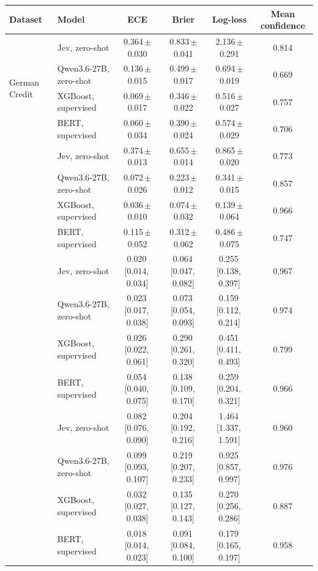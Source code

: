 \begin{tabular}{llcccc}
\toprule
Dataset & Model & ECE & Brier & Log-loss & Mean confidence \\
\midrule
\multirow{4}{*}{German Credit} & Jev, zero-shot & 0.364\,{\scriptsize$\pm$0.030} & 0.833\,{\scriptsize$\pm$0.041} & 2.136\,{\scriptsize$\pm$0.291} & 0.814 \\
 & Qwen3.6-27B, zero-shot & 0.136\,{\scriptsize$\pm$0.015} & 0.499\,{\scriptsize$\pm$0.017} & 0.694\,{\scriptsize$\pm$0.019} & 0.669 \\
 & XGBoost, supervised & 0.069\,{\scriptsize$\pm$0.017} & 0.346\,{\scriptsize$\pm$0.022} & 0.516\,{\scriptsize$\pm$0.027} & 0.757 \\
 & BERT, supervised & 0.060\,{\scriptsize$\pm$0.034} & 0.390\,{\scriptsize$\pm$0.024} & 0.574\,{\scriptsize$\pm$0.029} & 0.706 \\
\addlinespace
\multirow{4}{*}{Breast Cancer Wisconsin} & Jev, zero-shot & 0.374\,{\scriptsize$\pm$0.013} & 0.655\,{\scriptsize$\pm$0.014} & 0.865\,{\scriptsize$\pm$0.020} & 0.773 \\
 & Qwen3.6-27B, zero-shot & 0.072\,{\scriptsize$\pm$0.026} & 0.223\,{\scriptsize$\pm$0.012} & 0.341\,{\scriptsize$\pm$0.015} & 0.857 \\
 & XGBoost, supervised & 0.036\,{\scriptsize$\pm$0.010} & 0.074\,{\scriptsize$\pm$0.032} & 0.139\,{\scriptsize$\pm$0.064} & 0.966 \\
 & BERT, supervised & 0.115\,{\scriptsize$\pm$0.052} & 0.312\,{\scriptsize$\pm$0.062} & 0.486\,{\scriptsize$\pm$0.075} & 0.747 \\
\addlinespace
\multirow{4}{*}{SST-2} & Jev, zero-shot & 0.020\,{\scriptsize[0.014,\,0.034]} & 0.064\,{\scriptsize[0.047,\,0.082]} & 0.255\,{\scriptsize[0.138,\,0.397]} & 0.967 \\
 & Qwen3.6-27B, zero-shot & 0.023\,{\scriptsize[0.017,\,0.038]} & 0.073\,{\scriptsize[0.054,\,0.093]} & 0.159\,{\scriptsize[0.112,\,0.214]} & 0.974 \\
 & XGBoost, supervised & 0.026\,{\scriptsize[0.022,\,0.061]} & 0.290\,{\scriptsize[0.261,\,0.320]} & 0.451\,{\scriptsize[0.411,\,0.493]} & 0.799 \\
 & BERT, supervised & 0.054\,{\scriptsize[0.040,\,0.075]} & 0.138\,{\scriptsize[0.109,\,0.170]} & 0.259\,{\scriptsize[0.204,\,0.321]} & 0.966 \\
\addlinespace
\multirow{4}{*}{AG News} & Jev, zero-shot & 0.082\,{\scriptsize[0.076,\,0.090]} & 0.204\,{\scriptsize[0.192,\,0.216]} & 1.464\,{\scriptsize[1.337,\,1.591]} & 0.960 \\
 & Qwen3.6-27B, zero-shot & 0.099\,{\scriptsize[0.093,\,0.107]} & 0.219\,{\scriptsize[0.207,\,0.233]} & 0.925\,{\scriptsize[0.857,\,0.997]} & 0.976 \\
 & XGBoost, supervised & 0.032\,{\scriptsize[0.027,\,0.038]} & 0.135\,{\scriptsize[0.127,\,0.143]} & 0.270\,{\scriptsize[0.256,\,0.286]} & 0.887 \\
 & BERT, supervised & 0.018\,{\scriptsize[0.014,\,0.023]} & 0.091\,{\scriptsize[0.084,\,0.100]} & 0.179\,{\scriptsize[0.165,\,0.197]} & 0.958 \\
\bottomrule
\end{tabular}
